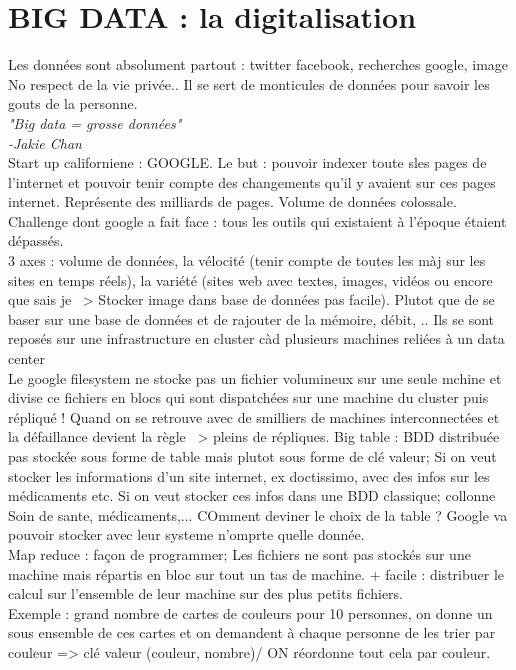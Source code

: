 \documentclass[10pt,a4paper]{article}
\begin{document}
\section{BIG DATA : la digitalisation}
Les données sont absolument partout : twitter facebook, recherches google, image \\ No respect de la vie privée.. Il se sert de monticules de données pour savoir les gouts de la personne. \\ \textit{"Big data = grosse données"\\-Jakie Chan}\\
Start up californiene : GOOGLE. Le but : pouvoir indexer toute sles pages de l'internet et pouvoir tenir compte des changements qu'il y avaient sur ces pages internet. Représente des milliards de pages. Volume de données colossale.\\
Challenge dont google a fait face : tous les outils qui existaient à l'époque étaient dépassés.\\
3 axes : volume de données, la vélocité (tenir compte de toutes les màj sur les sites en temps réels), la variété (sites web avec textes, images, vidéos ou encore que sais je ~> Stocker image dans base de données pas facile). Plutot que de se baser sur une base de données et de rajouter de la mémoire, débit, .. Ils se sont reposés sur une infrastructure en cluster càd plusieurs machines reliées à un data center \\ Le google filesystem ne stocke pas un fichier volumineux sur une seule mchine et divise ce fichiers en blocs qui sont dispatchées sur une machine du cluster puis répliqué ! Quand on se retrouve avec de smilliers de machines interconnectées et la défaillance devient la règle ~> pleins de répliques. Big table : BDD distribuée pas stockée sous forme de table mais plutot sous forme de clé valeur; Si on veut stocker les informations d'un site internet, ex doctissimo, avec des infos sur les médicaments etc. Si on veut stocker ces infos dans une BDD classique; collonne Soin de sante, médicaments,... COmment deviner le choix de la table ? Google va pouvoir stocker avec leur systeme n'omprte quelle donnée. \\
Map reduce : façon de programmer; Les fichiers ne sont pas stockés sur une machine mais répartis en bloc sur tout un tas de machine. + facile : distribuer le calcul sur l'ensemble de leur machine sur des plus petits fichiers.\\
Exemple : grand nombre de cartes de couleurs pour 10 personnes, on donne un sous ensemble de ces cartes et on demandent à chaque personne de les trier par couleur => clé valeur (couleur, nombre)/ ON réordonne tout cela par couleur. \\
\end{document}
